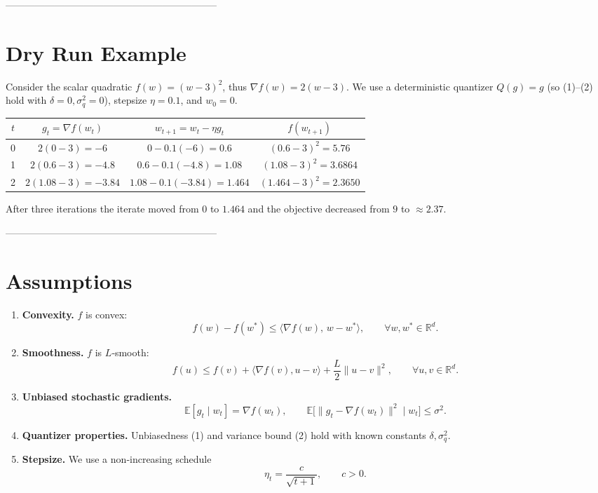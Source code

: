 \documentclass{article}
\newcommand{\E}{\mathbb{E}}
\newcommand{\R}{\mathbb{R}}
\begin{document}
-----------------------------------------------------------------
\section*{Dry Run Example}
Consider the scalar quadratic $f(w)=(w-3)^{2}$, thus $\nabla f(w)=2(w-3)$.  
We use a deterministic quantizer $Q(g)=g$ (so (1)–(2) hold with $\delta=0,\sigma_{q}^{2}=0$), stepsize $\eta=0.1$, and $w_{0}=0$.

\begin{center}
\begin{tabular}{c|c|c|c}
$t$ & $g_{t}= \nabla f(w_{t})$ & $w_{t+1}=w_{t}-\eta g_{t}$ & $f(w_{t+1})$ \\ \hline
0 & $2(0-3)=-6$ & $0-0.1(-6)=0.6$ & $(0.6-3)^{2}=5.76$ \\
1 & $2(0.6-3)=-4.8$ & $0.6-0.1(-4.8)=1.08$ & $(1.08-3)^{2}=3.6864$ \\
2 & $2(1.08-3)=-3.84$ & $1.08-0.1(-3.84)=1.464$ & $(1.464-3)^{2}=2.3650$ \\
\end{tabular}
\end{center}
After three iterations the iterate moved from $0$ to $1.464$ and the objective decreased from $9$ to $\approx2.37$.

-----------------------------------------------------------------
\section*{Assumptions}
\begin{enumerate}[label={A\arabic*}.]
\item \textbf{Convexity.} $f$ is convex:
\[
f(w)-f(w^{*})\le\langle\nabla f(w),\,w-w^{*}\rangle,\qquad\forall w,w^{*}\in\R^{d}. \tag{A1}
\]
\item \textbf{Smoothness.} $f$ is $L$‑smooth:
\[
f(u)\le f(v)+\langle\nabla f(v),u-v\rangle+\frac{L}{2}\|u-v\|^{2},
\qquad\forall u,v\in\R^{d}. \tag{A2}
\]
\item \textbf{Unbiased stochastic gradients.}
\[
\E[g_{t}\mid w_{t}]=\nabla f(w_{t}),\qquad 
\E\big[\|g_{t}-\nabla f(w_{t})\|^{2}\mid w_{t}\big]\le\sigma^{2}. \tag{A3}
\]
\item \textbf{Quantizer properties.} Unbiasedness (1) and variance bound (2) hold with known constants $\delta,\sigma_{q}^{2}$. 
\item \textbf{Stepsize.} We use a non‑increasing schedule
\[
\eta_{t}=\frac{c}{\sqrt{t+1}},\qquad c>0. \tag{A5}
\]
\end{enumerate}
\end{document}
